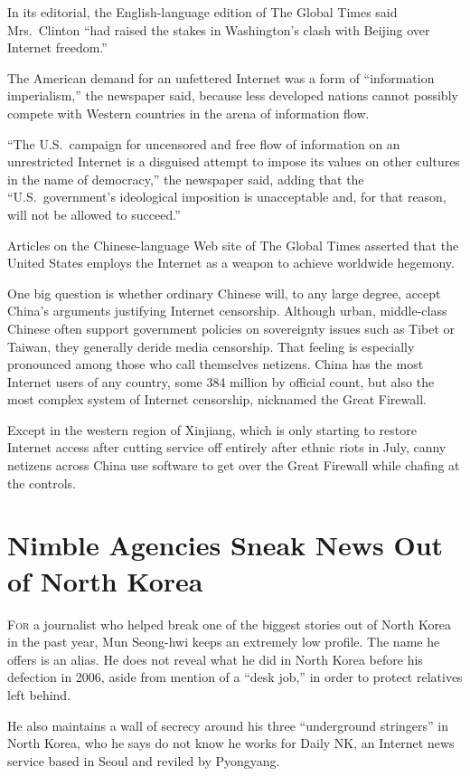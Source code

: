 ﻿\documentclass[12pt]{article}
\begin{document}
In its editorial, the English-language edition of The Global Times said Mrs.~Clinton ``had raised
the stakes in Washington's clash with Beijing over Internet freedom.''

The American demand for an unfettered Internet was a form of ``information imperialism,'' the
newspaper said, because less developed nations cannot possibly compete with Western countries in the
arena of information flow.

``The U.S.~campaign for uncensored and free flow of information on an unrestricted Internet is a
disguised attempt to impose its values on other cultures in the name of democracy,'' the newspaper
said, adding that the ``U.S.~government's ideological imposition is unacceptable and, for that
reason, will not be allowed to succeed.''

Articles on the Chinese-language Web site of The Global Times asserted that the United States
employs the Internet as a weapon to achieve worldwide hegemony.

One big question is whether ordinary Chinese will, to any large degree, accept China's arguments
justifying Internet censorship. Although urban, middle-class Chinese often support government
policies on sovereignty issues such as Tibet or Taiwan, they generally deride media censorship. That
feeling is especially pronounced among those who call themselves netizens. China has the most
Internet users of any country, some 384 million by official count, but also the most complex system
of Internet censorship, nicknamed the Great Firewall.

Except in the western region of Xinjiang, which is only starting to restore Internet access after
cutting service off entirely after ethnic riots in July, canny netizens across China use software to
get over the Great Firewall while chafing at the controls.

\section{Nimble Agencies Sneak News Out of North Korea}

\lettrine{F}{or} a journalist who helped break one of the biggest stories
out of North Korea in the past year, Mun Seong-hwi keeps an extremely low profile. The name he
offers is an alias. He does not reveal what he did in North Korea before his defection in 2006,
aside from mention of a ``desk job,'' in order to protect relatives left behind.

He also maintains a wall of secrecy around his three ``underground stringers'' in North Korea, who
he says do not know he works for Daily NK, an Internet news service based in Seoul and reviled by
Pyongyang.
\end{document}
